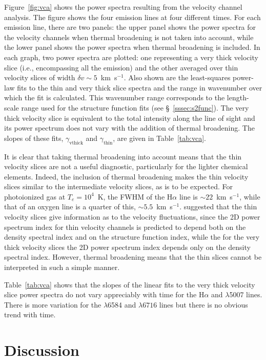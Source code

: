 \documentclass[useAMS,usenatbib]{mn2e}
\begin{document}
Figure~\ref{fig:vca} shows the power spectra resulting from the
velocity channel analysis. The figure shows the four emission lines at
four different times. For each emission line, there are two panels:
the upper panel shows the power spectra for the velocity channels when
thermal broadening is not taken into account, while the lower panel
shows the power spectra when thermal broadening is included. In each
graph, two power spectra are plotted: one representing a very thick velocity
slice (i.e., encompassing all the emission) and the other averaged
over thin velocity slices
of width $\delta v \sim 5$~km~s$^{-1}$.
Also shown are the least-squares power-law fits to the thin and very
thick slice spectra  and the range in wavenumber over which the fit is
calculated. This
wavenumber range corresponds to the length-scale range used for the
structure function fits (see \S~\ref{sssec:s2func}).
The very thick velocity slice is equivalent to the total
intensity along the line of sight and its power spectrum does not
vary with the addition of thermal broadening.  The slopes of these
fits, $\gamma_{\mathrm{vthick}}$ and $\gamma_{\mathrm{thin}}$, are
given in Table~\ref{tab:vca}.

It is clear that taking thermal broadening into account means that the
thin velocity slices are not a useful diagnostic, particularly for the
lighter chemical elements. Indeed, the inclusion of thermal
broadening makes the thin velocity slices similar to the intermediate
velocity slices, as is to be expected. For photoionized gas at $T_e= 10^4$~K, the
FWHM of the H$\alpha$ line is $\sim 22$~km~s$^{-1}$, while that of an
oxygen line is a quarter of this, $\sim
5.5$~km~s$^{-1}$. \citet{2000ApJ...537..720L}  
suggested that the thin velocity slices give information as to the
velocity fluctuations, since the 2D power spectrum index for thin
velocity channels is predicted to depend both on the density spectral
index and on the structure function index, while the for the very thick
velocity slices the 2D power spectrum index depends only on the density spectral index. However,
thermal broadening means that the thin slices cannot be interpreted in
such a simple manner. 

Table~\ref{tab:vca} shows that the slopes of the linear fits to the very
thick velocity slice power spectra do not vary appreciably with time
for the H$\alpha$ and \oiii$\lambda$5007 lines. There is more
variation for the \nii$\lambda$6584 and \sii$\lambda6716$ lines but
there is no obvious trend with time.


\section{Discussion}
\label{sec:discuss}
\end{document}
